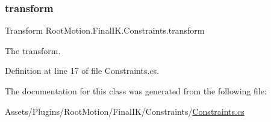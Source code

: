 \subsubsection{\texorpdfstring{transform}{transform}}
{\footnotesize\ttfamily Transform Root\+Motion.\+Final\+I\+K.\+Constraints.\+transform}



The transform. 



Definition at line 17 of file Constraints.\+cs.



The documentation for this class was generated from the following file\+:\begin{DoxyCompactItemize}
\item 
Assets/\+Plugins/\+Root\+Motion/\+Final\+I\+K/\+Constraints/\mbox{\hyperlink{_constraints_8cs}{Constraints.\+cs}}\end{DoxyCompactItemize}
